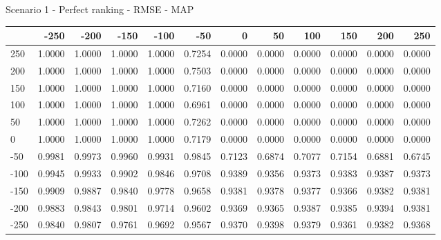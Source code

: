 Scenario 1 - Perfect ranking - RMSE - MAP
\begin{tabular}{lrrrrrrrrrrr}
\toprule
{} &   -250 &   -200 &   -150 &   -100 &   -50  &    0   &    50  &    100 &    150 &    200 &    250 \\
\midrule
 250 & 1.0000 & 1.0000 & 1.0000 & 1.0000 & 0.7254 & 0.0000 & 0.0000 & 0.0000 & 0.0000 & 0.0000 & 0.0000 \\
 200 & 1.0000 & 1.0000 & 1.0000 & 1.0000 & 0.7503 & 0.0000 & 0.0000 & 0.0000 & 0.0000 & 0.0000 & 0.0000 \\
 150 & 1.0000 & 1.0000 & 1.0000 & 1.0000 & 0.7160 & 0.0000 & 0.0000 & 0.0000 & 0.0000 & 0.0000 & 0.0000 \\
 100 & 1.0000 & 1.0000 & 1.0000 & 1.0000 & 0.6961 & 0.0000 & 0.0000 & 0.0000 & 0.0000 & 0.0000 & 0.0000 \\
 50  & 1.0000 & 1.0000 & 1.0000 & 1.0000 & 0.7262 & 0.0000 & 0.0000 & 0.0000 & 0.0000 & 0.0000 & 0.0000 \\
 0   & 1.0000 & 1.0000 & 1.0000 & 1.0000 & 0.7179 & 0.0000 & 0.0000 & 0.0000 & 0.0000 & 0.0000 & 0.0000 \\
-50  & 0.9981 & 0.9973 & 0.9960 & 0.9931 & 0.9845 & 0.7123 & 0.6874 & 0.7077 & 0.7154 & 0.6881 & 0.6745 \\
-100 & 0.9945 & 0.9933 & 0.9902 & 0.9846 & 0.9708 & 0.9389 & 0.9356 & 0.9373 & 0.9383 & 0.9387 & 0.9373 \\
-150 & 0.9909 & 0.9887 & 0.9840 & 0.9778 & 0.9658 & 0.9381 & 0.9378 & 0.9377 & 0.9366 & 0.9382 & 0.9381 \\
-200 & 0.9883 & 0.9843 & 0.9801 & 0.9714 & 0.9602 & 0.9369 & 0.9365 & 0.9387 & 0.9385 & 0.9394 & 0.9381 \\
-250 & 0.9840 & 0.9807 & 0.9761 & 0.9692 & 0.9567 & 0.9370 & 0.9398 & 0.9379 & 0.9361 & 0.9382 & 0.9368 \\
\bottomrule
\end{tabular}

